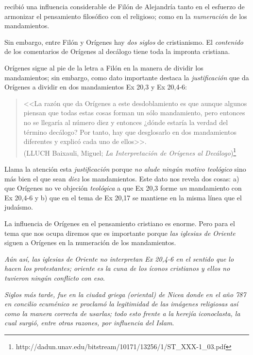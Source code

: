 \documentclass{article}
\begin{document}
recibi\'o una influencia considerable de Fil\'{o}n de Alejandr\'{i}a tanto en el esfuerzo de armonizar el pensamiento filos\'{o}fico con el religioso; como en la \emph{numeraci\'on} de los mandamientos.

Sin embargo, entre Fil\'on y Or\'{i}genes hay \emph{dos siglos} de cristianismo. El \emph{contenido} de los comentarios de Or\'{i}genes al dec\'alogo tiene toda la impronta cristiana.

Or\'{i}genes sigue al pie de la letra a Fil\'on en la manera de dividir los mandamientos; sin embargo, como dato importante destaca la \emph{justificaci\'on} que da Or\'{i}genes a dividir en dos mandamientos Ex 20,3 y Ex 20,4-6:

\begin{quote}
<<La razón que da Orígenes a este desdoblamiento es que aunque
algunos piensan que todas estas cosas forman un sólo mandamiento, pero
entonces no se llegaría al número diez y entonces ¿dónde estaría la verdad
del término decálogo? Por tanto, hay que desglosarlo en dos mandamientos
diferentes y explicó cada uno de ellos>>.\\
(LLUCH Baixauli, Miguel; \emph{La Interpretación de Orígenes al Decálogo})\footnote{http://dadun.unav.edu/bitstream/10171/13256/1/ST\_XXX-1\_03.pdf}
\end{quote}

\noindent
Llama la atenci\'on esta \emph{justificaci\'on} porque \emph{no alude ning\'un motivo teol\'ogico} sino m\'as bien el que sean \emph{diez} los mandamientos. Este dato nos revela dos cosas: a) que Or\'{i}genes no ve objeci\'on \emph{teol\'ogica} a que Ex 20,3 forme \emph{un} mandamiento con Ex 20,4-6 y b) que en el tema de Ex 20,17 se mantiene en la misma l\'{i}nea que el juda\'{i}smo.

La influencia de Or\'{i}genes en el pensamiento cristiano es enorme. Pero para el tema que nos ocupa diremos que es importante porque \emph{las iglesias de Oriente} siguen a Or\'{i}genes en la numeraci\'on de los mandamientos.

\emph{A\'un as\'{i}, las iglesias de Oriente no interpretan Ex 20,4-6 en el sentido que lo hacen los protestantes; oriente es la cuna de los \'{i}conos cristianos y ellos no tuvieron ning\'un conflicto con eso}. 

\emph{Siglos m\'as tarde, fue en la ciudad griega (oriental) de Nicea donde en el a\~no 787 en concilio ecum\'enico se proclam\'o la legitimidad de las im\'agenes religiosas as\'{i} como la manera correcta de usarlas; todo esto frente a la herej\'{i}a iconoclasta, la cual surgi\'o, entre otras razones, por influencia del Islam}.
\end{document}
